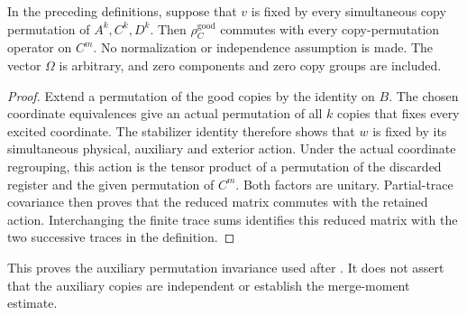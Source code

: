 \begin{theorem}
\label{thm:replica_good_auxiliary_marginal_commute}
\leanok
In the preceding definitions, suppose that $v$ is fixed by every
simultaneous copy permutation of $A^k,C^k,D^k$. Then
$\rho_C^{\mathrm{good}}$ commutes with every copy-permutation operator
on $C^m$. No normalization or independence assumption is made. The vector
$\Omega$ is arbitrary, and zero components and zero copy groups are included.
\end{theorem}
\begin{proof}
\leanok
{}
Extend a permutation of the good copies by the identity on $B$. The chosen
coordinate equivalences give an actual permutation of all $k$ copies that
fixes every excited coordinate. The stabilizer identity therefore shows
that $w$ is fixed by its simultaneous physical, auxiliary and exterior
action. Under the actual coordinate regrouping, this action is the tensor
product of a permutation of the discarded register and the given
permutation of $C^m$. Both factors are unitary. Partial-trace covariance
then proves that the reduced matrix commutes with the retained action.
Interchanging the finite trace sums identifies this reduced matrix with
the two successive traces in the definition.
\end{proof}

This proves the auxiliary permutation invariance used after
\cite[Section~7, equation \textup{(comparator:merge-moments)}]{OpenAI2026AreaLaw}.
It does not assert that the auxiliary copies are independent or establish
the merge-moment estimate.
